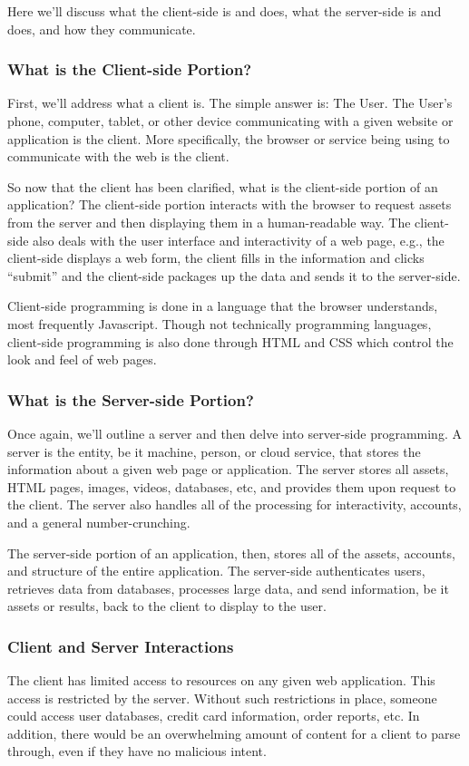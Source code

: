 \documentclass[11pt]{article}
\begin{document}
Here we'll discuss what the client-side is and does, what the server-side is and does, and how they communicate.

\subsubsection{What is the Client-side Portion?}
First, we'll address what a client is. The simple answer is: The User. The User's phone, computer, tablet, or other device communicating with a given website or application is the client. More specifically, the browser or service being using to communicate with the web is the client. 

So now that the client has been clarified, what is the client-side portion of an application? The client-side portion interacts with the browser to request assets from the server and then displaying them in a human-readable way. The client-side also deals with the user interface and interactivity of a web page, e.g., the client-side displays a web form, the client fills in the information and clicks ``submit'' and the client-side packages up the data and sends it to the server-side.

Client-side programming is done in a language that the browser understands, most frequently Javascript. Though not technically programming languages, client-side programming is also done through HTML and CSS which control the look and feel of web pages.

\subsubsection{What is the Server-side Portion?}
Once again, we'll outline a server and then delve into server-side programming. A server is the entity, be it machine, person, or cloud service, that stores the information about a given web page or application. The server stores all assets, HTML pages, images, videos, databases, etc, and provides them upon request to the client. The server also handles all of the processing for interactivity, accounts, and a general number-crunching.

The server-side portion of an application, then, stores all of the assets, accounts, and structure of the entire application. The server-side authenticates users, retrieves data from databases, processes large data, and send information, be it assets or results, back to the client to display to the user.

\subsubsection{Client and Server Interactions}
The client has limited access to resources on any given web application. This access is restricted by the server. Without such restrictions in place, someone could access user databases, credit card information, order reports, etc. In addition, there would be an overwhelming amount of content for a client to parse through, even if they have no malicious intent.
\end{document}
